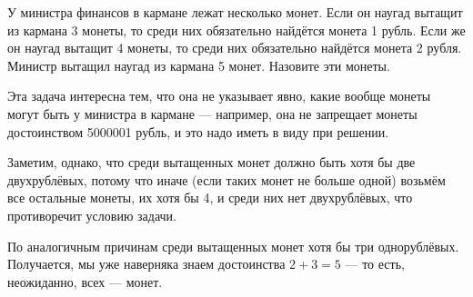 
\begin{itemize}

	\itC У министра финансов в кармане лежат несколько монет. Если он наугад вытащит из кармана 3 монеты, то среди них обязательно найдётся монета 1 рубль. Если же он наугад вытащит 4 монеты, то среди них обязательно найдётся монета 2 рубля. Министр вытащил наугад из кармана 5 монет. Назовите эти монеты.
	
	\itr Эта задача интересна тем, что она не указывает явно, какие вообще монеты могут быть у министра в кармане — например, она не запрещает монеты достоинством 5000001 рубль, и это надо иметь в виду при решении.
	
	Заметим, однако, что среди вытащенных монет должно быть хотя бы две двухрублёвых, потому что иначе (если таких монет не больше одной) возьмём все остальные монеты, их хотя бы 4, и среди них нет двухрублёвых, что противоречит условию задачи.
	
	По аналогичным причинам среди вытащенных монет хотя бы три однорублёвых. Получается, мы уже наверняка знаем достоинства $2+3 = 5$ — то есть, неожиданно, всех — монет.

\end{itemize}